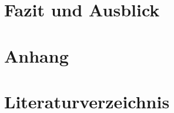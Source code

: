\documentclass[a4paper, 12pt]{scrreprt}
\begin{document}
\chapter{Fazit und Ausblick}

\chapter{Anhang}

\chapter{Literaturverzeichnis}
\printbibliography[heading=none , notkeyword={bild}]
%
%
%
%
%
%
%
%
%
%
%
%
%
\end{document}
